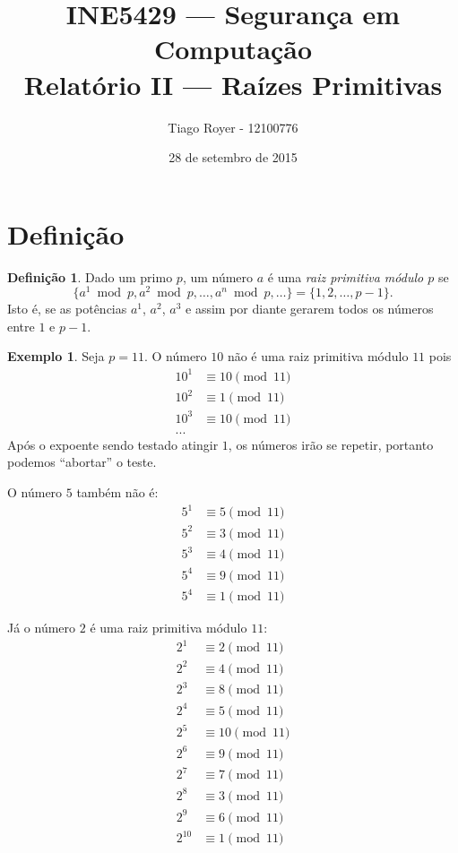\documentclass{article}
\title{
    INE5429 --- Segurança em Computação \\
    Relatório II --- Raízes Primitivas
}
\author{
    Tiago Royer - 12100776
}
\date{28 de setembro de 2015}
\theoremstyle{definition}
\newtheorem{definition}{Definição}
\newtheorem{example}{Exemplo}
\begin{document}
\maketitle

\section{Definição}

\begin{definition}
    Dado um primo $p$,
    um número $a$ é uma \emph{raiz primitiva módulo $p$}
    se
    \begin{equation*}
        \{a^1 \bmod p, a^2 \bmod p, \dots, a^n \bmod p, \dots \} = \{1, 2, \dots, p-1\}.
    \end{equation*}
    Isto é, se as potências $a^1$, $a^2$, $a^3$ e assim por diante
    gerarem todos os números entre $1$ e $p-1$.
\end{definition}

\begin{example}
    Seja $p = 11$.
    O número $10$ não é uma raiz primitiva módulo $11$ pois
    \begin{align*}
        10^1 &\equiv 10 \pmod{11} \\
        10^2 &\equiv 1 \pmod{11} \\
        10^3 &\equiv 10 \pmod{11} \\
        ...
    \end{align*}
    Após o expoente sendo testado atingir $1$,
    os números irão se repetir,
    portanto podemos ``abortar'' o teste.

    O número $5$ também não é:
    \begin{align*}
        5^1 &\equiv 5 \pmod{11} \\
        5^2 &\equiv 3 \pmod{11} \\
        5^3 &\equiv 4 \pmod{11} \\
        5^4 &\equiv 9 \pmod{11} \\
        5^4 &\equiv 1 \pmod{11}
    \end{align*}

    Já o número $2$ é uma raiz primitiva módulo $11$:
    \begin{align*}
        2^1 &\equiv 2 \pmod{11} \\
        2^2 &\equiv 4 \pmod{11} \\
        2^3 &\equiv 8 \pmod{11} \\
        2^4 &\equiv 5 \pmod{11} \\
        2^5 &\equiv 10 \pmod{11} \\
        2^6 &\equiv 9 \pmod{11} \\
        2^7 &\equiv 7 \pmod{11} \\
        2^8 &\equiv 3 \pmod{11} \\
        2^9 &\equiv 6 \pmod{11} \\
        2^{10} &\equiv 1 \pmod{11}
    \end{align*}
\end{example}
\end{document}
